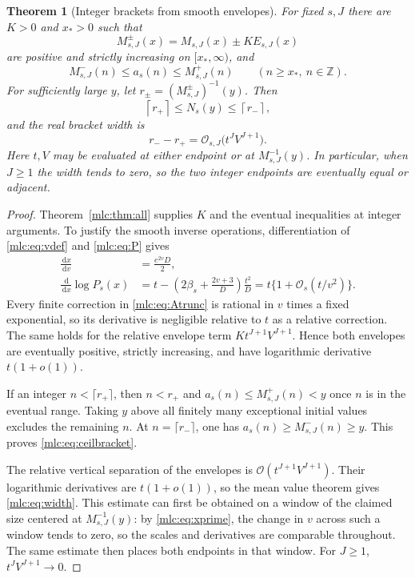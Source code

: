 \documentclass[11pt]{article}
\newtheorem{theorem}{Theorem}[section]
\theoremstyle{remark}\newtheorem{remark}[theorem]{Remark}
\newcommand{\OO}{\mathcal O}
\newcommand{\dd}{\,\mathrm d}
\begin{document}
\begin{theorem}[Integer brackets from smooth envelopes]\label{mlc:thm:brackets}
For fixed $s,J$ there are $K>0$ and $x_*>0$ such that
\begin{equation}\label{mlc:eq:envelopes}
 M_{s,J}^{\pm}(x)=M_{s,J}(x)\pm K E_{s,J}(x)
\end{equation}
are positive and strictly increasing on $[x_*,\infty)$, and
\begin{equation}\label{mlc:eq:envelopebound}
 M_{s,J}^{-}(n)\le a_s(n)\le M_{s,J}^{+}(n)
                      \qquad(n\ge x_*,\ n\in\mathbb Z).
\end{equation}
For sufficiently large $y$, let $r_\pm=(M_{s,J}^{\pm})^{-1}(y)$. Then
\begin{equation}\label{mlc:eq:ceilbracket}
 \left\lceil r_+\right\rceil\le N_s(y)
                         \le\left\lceil r_-\right\rceil,
\end{equation}
and the real bracket width is
\begin{equation}\label{mlc:eq:width}
 r_--r_+=\OO_{s,J}\bigl(t^JV^{J+1}\bigr).
\end{equation}
Here $t,V$ may be evaluated at either endpoint or at $M_{s,J}^{-1}(y)$. In particular, when $J\ge1$ the width tends to zero, so the two integer endpoints are eventually equal or adjacent.
\end{theorem}
\begin{proof}
Theorem~\ref{mlc:thm:all} supplies $K$ and the eventual inequalities at integer arguments. To justify the smooth inverse operations, differentiation of \eqref{mlc:eq:vdef} and \eqref{mlc:eq:P} gives
\begin{align}
 \frac{\dd x}{\dd v}&=\frac{e^{2v}D}{2},\label{mlc:eq:xprime}\\
 \frac{\dd}{\dd x}\log P_s(x)
   &=t-\left(2\beta_s+\frac{2v+3}{D}\right)\frac{t^2}{D}
    =t\{1+\OO_s(t/v^2)\}.\label{mlc:eq:Pprime}
\end{align}
Every finite correction in \eqref{mlc:eq:Atrunc} is rational in $v$ times a fixed exponential, so its derivative is negligible relative to $t$ as a relative correction. The same holds for the relative envelope term $Kt^{J+1}V^{J+1}$. Hence both envelopes are eventually positive, strictly increasing, and have logarithmic derivative $t(1+o(1))$.

If an integer $n<\lceil r_+\rceil$, then $n<r_+$ and $a_s(n)\le M^+_{s,J}(n)<y$ once $n$ is in the eventual range. Taking $y$ above all finitely many exceptional initial values excludes the remaining $n$. At $n=\lceil r_-\rceil$, one has $a_s(n)\ge M^-_{s,J}(n)\ge y$. This proves \eqref{mlc:eq:ceilbracket}.

The relative vertical separation of the envelopes is $\OO(t^{J+1}V^{J+1})$. Their logarithmic derivatives are $t(1+o(1))$, so the mean value theorem gives \eqref{mlc:eq:width}. This estimate can first be obtained on a window of the claimed size centered at $M_{s,J}^{-1}(y)$: by \eqref{mlc:eq:xprime}, the change in $v$ across such a window tends to zero, so the scales and derivatives are comparable throughout. The same estimate then places both endpoints in that window. For $J\ge1$, $t^JV^{J+1}\to0$.
\end{proof}
\end{document}
